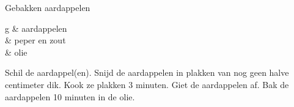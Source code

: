 \begin{recipe}
[ %
    preparationtime = {\unit[1/4]{h}},
    bakingtime = {\unit[3]{min} koken, \unit[10]{min} bakken},
    portion = {\portion{1}},
    calory,
    source = {Steven Speek}
]
{Gebakken aardappelen}

    \ingredients
    {%
        \unit[200]{g} & aardappelen\\
	& peper en zout \\
	& olie \\
    }

    \preparation
    {%
        \step Schil de aardappel(en).
        \step Snijd de aardappelen in plakken van nog geen halve centimeter dik.
        \step Kook ze plakken 3 minuten.
        \step Giet de aardappelen af.
	\step Bak de aardappelen 10 minuten in de olie.
    }
    
\end{recipe}
